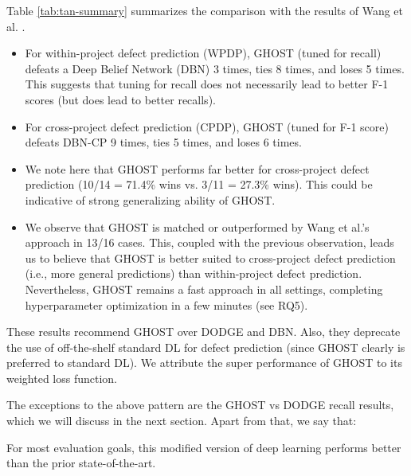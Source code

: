 \documentclass[10pt,compsoc,twocolumn]{IEEEtran}
\newcommand{\bi}{\begin{itemize}}
\newcommand{\ei}{\end{itemize}}
\newcommand{\respto}[1]{
\fcolorbox{black}{black!15}{%
\label{resp:#1}%
\bf\scriptsize R{#1}}}
\newcommand{\BLUE}{\color{blue}}
\newcommand{\BLACK}{\color{black}}
\begin{document}
Table \ref{tab:tan-summary} summarizes the comparison with the results of Wang et al. \cite{wang2016automatically}.
\bi
    \item For within-project defect prediction (WPDP), GHOST (tuned for recall) defeats a Deep Belief Network (DBN) 3 times, ties 8 times, and loses 5 times. This suggests that tuning for recall does not necessarily lead to better F-1 scores (but does lead to better recalls).
    \item For cross-project defect prediction (CPDP), GHOST (tuned for F-1 score) defeats DBN-CP 9 times, ties 5 times, and loses 6 times.
    \item We note here that GHOST performs far better for cross-project defect prediction (10/14 = 71.4\% wins vs. 3/11 = 27.3\% wins). This could be indicative of strong generalizing ability of GHOST.
    \item
    \BLUE
    We observe that GHOST is matched or outperformed by Wang et al.'s approach in 13/16 cases. This, coupled with the previous observation, leads us to believe that GHOST is better suited to cross-project defect prediction (i.e., more general predictions) than within-project defect prediction. Nevertheless, GHOST remains a fast approach in all settings, completing hyperparameter optimization in a few minutes (see RQ5).
    \respto{2a2.1}
    \BLACK
\ei

These results recommend GHOST over DODGE and DBN. Also, they 
 deprecate the use of off-the-shelf standard DL for defect prediction (since GHOST clearly is preferred to standard DL). We attribute the super performance of GHOST to its weighted loss function.

The exceptions to the above pattern are the  GHOST vs DODGE recall results, which we will discuss in the next section.
Apart from that, we say that:

\begin{blockquote}
    \noindent
    For most evaluation goals, this modified version of deep learning performs better than the prior state-of-the-art.
\end{blockquote}

 
 
\end{document}
